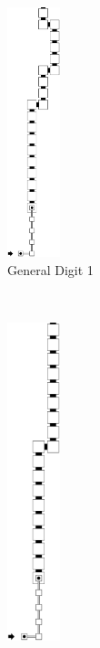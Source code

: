 \begin{itemize}
\begin{itemize}
        \end{itemize}


        \begin{figure}[H]
            \centering
            \begin{subfigure}[t]{0.17\textwidth}
                \centering
                \includegraphics[width=0.17\textwidth]{warping/post_warp_general_digit1}
                \caption{\label{fig:post_warp_general_digit1} General Digit 1}
            \end{subfigure}%
            ~
            \begin{subfigure}[t]{0.17\textwidth}
                \centering
                \includegraphics[width=0.17\textwidth]{warping/post_warp_general_digit2and3}

\end{subfigure}
\end{figure}
\end{itemize}
